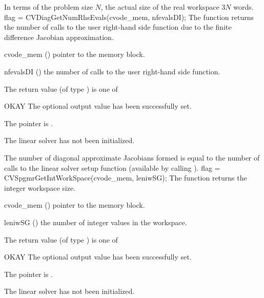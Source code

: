 {
  In terms of the problem size $N$, the actual size of the real workspace
  $3 N$  words.
}
{
  flag = CVDiagGetNumRhsEvals(cvode\_mem, nfevalsDI);
}
{
  The function  returns the
  number of calls to the user right-hand side function due to the 
  finite difference Jacobian approximation.
}
{
  \begin{args}
  \item[cvode\_mem] ()
    pointer to the {\cvode} memory block.
  \item[nfevalsDI] ()
    the number of calls to the user right-hand side function.
  \end{args}
}
{
  The return value  (of type ) is one of
  \begin{args}
  \item[OKAY] 
    The optional output value has been successfully set.
  \item[\Id{LIN\_NO\_MEM}]
    The  pointer is .
  \item[\Id{LIN\_NO\_LMEM}]
    The {\cvdiag} linear solver has not been initialized.
  \end{args}
}
{
  The number of diagonal approximate Jacobians formed is
  equal to the number of calls to the linear solver setup function
  (available by calling ).
}
%
%
{
  flag = CVSpgmrGetIntWorkSpace(cvode\_mem, leniwSG);
}
{
  The function  returns the
  {\cvspgmr} integer workspace size.
}
{
  \begin{args}
  \item[cvode\_mem] ()
    pointer to the {\cvode} memory block.
  \item[leniwSG] ()
    the number of integer values in the {\cvspgmr} workspace.
  \end{args}
}
{
  The return value  (of type ) is one of
  \begin{args}
  \item[OKAY] 
    The optional output value has been successfully set.
  \item[\Id{LIN\_NO\_MEM}]
    The  pointer is .
  \item[\Id{LIN\_NO\_LMEM}]
    The {\cvspgmr} linear solver has not been initialized.
  \end{args}
}
